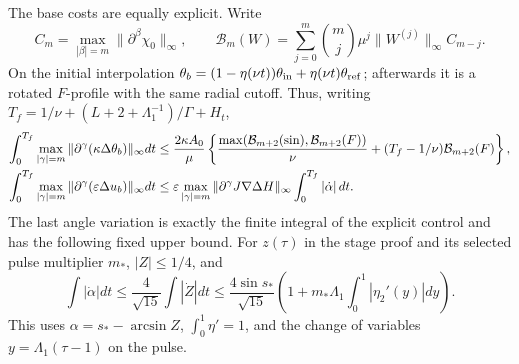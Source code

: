 The base costs are equally explicit. Write
\[
 C_m=\max_{|\beta|=m}\|\partial^\beta\chi_0\|_\infty,
 \qquad
 \mathcal B_m(W)=\sum_{j=0}^m\binom mj\mu^j
 \|W^{(j)}\|_\infty C_{m-j}.
\]
On the initial interpolation
$\theta_b=(1-\eta(\nu t))\theta_{\rm in}
+\eta(\nu t)\theta_{\rm ref}$; afterwards it is a rotated
$F$-profile with the same radial cutoff. Thus, writing
$T_f=1/\nu+(L+2+\Lambda_1^{-1})/\Gamma+H_t$,
\begin{align}
 \int_0^{T_f}\max_{|\gamma|=m}\|\partial^\gamma
 (\kappa\Delta\theta_b)\|_\infty dt
 &\leq\frac{2\kappa A_0}{\mu}
 \left\{\frac{\max(\mathcal B_{m+2}(\sin),\mathcal B_{m+2}(F))}{\nu}
 +(T_f-1/\nu)\mathcal B_{m+2}(F)\right\},\notag\\
 \int_0^{T_f}\max_{|\gamma|=m}\|\partial^\gamma
 (\varepsilon\Delta u_b)\|_\infty dt
 &\leq \varepsilon\max_{|\gamma|=m}
 \|\partial^\gamma J\nabla\Delta H\|_\infty
 \int_0^{T_f}|\dot\alpha|\,dt.\label{eq:basecosts}
\end{align}
The last angle variation is exactly the finite integral of the
explicit control and has the following fixed upper bound. For
$z(\tau)$ in the stage proof and its selected pulse multiplier
$m_*$, $|Z|\leq1/4$, and
\[
 \int|\dot\alpha|dt\leq\frac4{\sqrt{15}}\int|\dot Z|dt
 \leq\frac{4\sin s_*}{\sqrt{15}}
 \left(1+m_*\Lambda_1\int_0^1|\eta_2'(y)|dy\right).
\]
This uses $\alpha=s_*-\arcsin Z$, $\int_0^1\eta'=1$, and
the change of variables $y=\Lambda_1(\tau-1)$ on the pulse.

